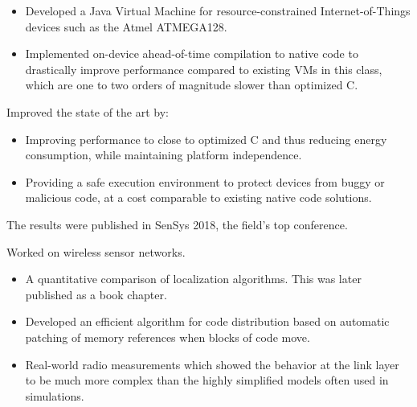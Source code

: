 \documentclass[10pt,a4paper]{../altacv}
\begin{document}
	\medskip
	
	
	\medskip
	
	
	\medskip
	
	\begin{itemize}
		\item Developed a Java Virtual Machine for resource-constrained Internet-of-Things devices such as the Atmel ATMEGA128.
		\item Implemented on-device ahead-of-time compilation to native code to drastically improve performance compared to existing VMs in this class, which are one to two orders of magnitude slower than optimized C.
	\end{itemize}
	
	\medskip
	
	Improved the state of the art by:
	
	\medskip
	
	\begin{itemize}
		\item Improving performance to close to optimized C and thus reducing energy consumption, while maintaining platform independence.
		\item Providing a safe execution environment to protect devices from buggy or malicious code, at a cost comparable to existing native code solutions.
	\end{itemize}
	
	\medskip
	
	The results were published in SenSys 2018, the field's top conference.
	
	\medskip
	
	
	
	
	\medskip\medskip{}
	
	Worked on wireless sensor networks.
	
	\medskip
	
	\begin{itemize}
		\item\small A quantitative comparison of localization algorithms. This was later published as a book chapter.
		\item\small Developed an efficient algorithm for code distribution based on automatic patching of memory references when blocks of code move.
		\item\small Real-world radio measurements which showed the behavior at the link layer to be much more complex than the highly simplified models often used in simulations.
	\end{itemize}
	
\end{document}
